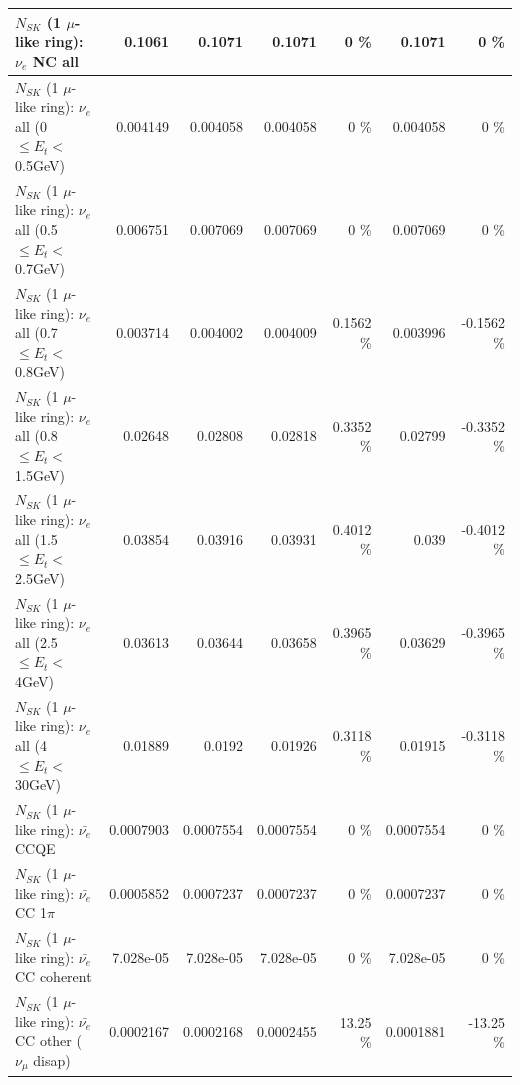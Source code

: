 \begin{table}
\begin{tabular}{| l | r | r | r  r | r  r |}
                                  $N_{SK}$ (1 $\mu$-like ring): $\nu_{e}$ NC all &          0.1061 &          0.1071 &          0.1071 &        0 \%  &          0.1071 &        0 \%  \\ 
\hline
           $N_{SK}$ (1 $\mu$-like ring): $\nu_{e}$ all (0 $\leq E_{t} <$ 0.5GeV) &        0.004149 &        0.004058 &        0.004058 &        0 \%  &        0.004058 &        0 \%  \\ 
         $N_{SK}$ (1 $\mu$-like ring): $\nu_{e}$ all (0.5 $\leq E_{t} <$ 0.7GeV) &        0.006751 &        0.007069 &        0.007069 &        0 \%  &        0.007069 &        0 \%  \\ 
         $N_{SK}$ (1 $\mu$-like ring): $\nu_{e}$ all (0.7 $\leq E_{t} <$ 0.8GeV) &        0.003714 &        0.004002 &        0.004009 &   0.1562 \%  &        0.003996 &  -0.1562 \%  \\ 
         $N_{SK}$ (1 $\mu$-like ring): $\nu_{e}$ all (0.8 $\leq E_{t} <$ 1.5GeV) &         0.02648 &         0.02808 &         0.02818 &   0.3352 \%  &         0.02799 &  -0.3352 \%  \\ 
         $N_{SK}$ (1 $\mu$-like ring): $\nu_{e}$ all (1.5 $\leq E_{t} <$ 2.5GeV) &         0.03854 &         0.03916 &         0.03931 &   0.4012 \%  &           0.039 &  -0.4012 \%  \\ 
           $N_{SK}$ (1 $\mu$-like ring): $\nu_{e}$ all (2.5 $\leq E_{t} <$ 4GeV) &         0.03613 &         0.03644 &         0.03658 &   0.3965 \%  &         0.03629 &  -0.3965 \%  \\ 
            $N_{SK}$ (1 $\mu$-like ring): $\nu_{e}$ all (4 $\leq E_{t} <$ 30GeV) &         0.01889 &          0.0192 &         0.01926 &   0.3118 \%  &         0.01915 &  -0.3118 \%  \\ 
\hline
\hline
\hline
                                $N_{SK}$ (1 $\mu$-like ring): $\bar{\nu_e}$ CCQE &       0.0007903 &       0.0007554 &       0.0007554 &        0 \%  &       0.0007554 &        0 \%  \\ 
                           $N_{SK}$ (1 $\mu$-like ring): $\bar{\nu_e}$ CC 1$\pi$ &       0.0005852 &       0.0007237 &       0.0007237 &        0 \%  &       0.0007237 &        0 \%  \\ 
                         $N_{SK}$ (1 $\mu$-like ring): $\bar{\nu_e}$ CC coherent &       7.028e-05 &       7.028e-05 &       7.028e-05 &        0 \%  &       7.028e-05 &        0 \%  \\ 
          $N_{SK}$ (1 $\mu$-like ring): $\bar{\nu_e}$ CC other ($\nu_\mu$ disap) &       0.0002167 &       0.0002168 &       0.0002455 &    13.25 \%  &       0.0001881 &   -13.25 \%  \\ 

\end{tabular}
\end{table}
